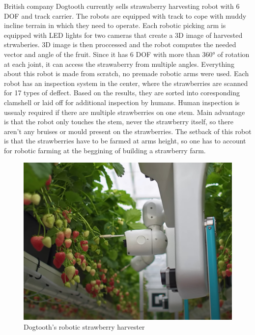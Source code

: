 \documentclass[a4paper,10pt]{article}
\theoremstyle{definition}
\begin{document}
British company Dogtooth currently sells strawaberry harvesting robot with 6 DOF and track carrier. The robots are equipped with track to cope with muddy incline terrain in which they need to operate. Each robotic picking arm is equipped with LED lights for two cameras that create a 3D image of harvested strwaberies. 3D image is then proccessed and the robot computes the needed vector and angle of the fruit. Since it has 6 DOF with more than 360° of rotation at each joint, it can access the strawaberry from multiple angles. Everything about this robot is made from scratch, no premade robotic arms were used. Each robot has an inspection system in the center, where the strawberries are scanned for 17 types of deffect. Based on the results, they are sorted into coresponding clamshell or laid off for additional inspection by humans. Human inspection is ussualy required if there are multiple strawberries on one stem. Main advantage is that the robot only touches the stem, never the strawberry itself, so there aren't any bruises or mould present on the strawberries. The setback of this robot is that the strawberries have to be farmed at arms height, so one has to account for robotic farming at the beggining of building a strawberry farm. 

\bigskip
\begin{figure}[h]
\begin{center}
\includegraphics[scale=0.7]{image/dogtooth.jpg}
\caption{Dogtooth's robotic strawberry harvester\cite{RwhHvBJPPy4tjYjk}}
\end{center}
\end{figure}
\newpage
\end{document}
